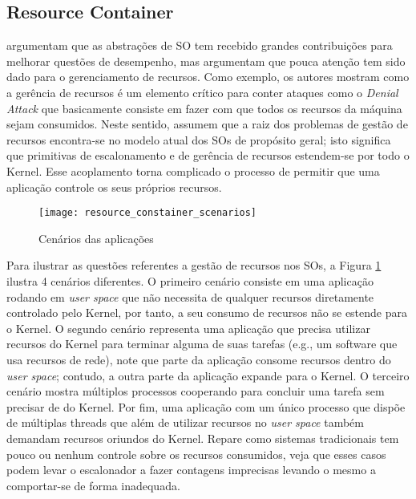 \subsection{Resource Container}
\label{sec:rc}

\cite{resourcecontainers} argumentam que as abstrações de SO tem recebido
grandes contribuições para melhorar questões de desempenho, mas argumentam que
pouca atenção tem sido dado para o gerenciamento de recursos. Como exemplo, os
autores mostram como a gerência de recursos é um elemento crítico para conter
ataques como o \emph{Denial Attack} que basicamente consiste em fazer
com que todos os recursos da máquina sejam consumidos. Neste sentido,
\cite{resourcecontainers} assumem que a raiz dos problemas de gestão de
recursos encontra-se no modelo atual dos SOs de propósito geral; isto significa
que primitivas de escalonamento e de gerência de recursos estendem-se por todo
o Kernel. Esse acoplamento torna complicado o processo de permitir que uma
aplicação controle os seus próprios recursos.

\begin{figure}[!h]
  \centering
  \texttt{[image: resource\_constainer\_scenarios]} 
  \caption{Cenários das aplicações}
  \label{fig:resource_constainer_scenarios}
\end{figure}

Para ilustrar as questões referentes a gestão de recursos nos SOs, a Figura
\ref{fig:resource_constainer_scenarios} ilustra 4 cenários diferentes. O
primeiro cenário consiste em uma aplicação rodando em \textit{user space} que
não necessita de qualquer recursos diretamente controlado pelo Kernel, por
tanto, a seu consumo de recursos não se estende para o Kernel. O segundo
cenário representa uma aplicação que precisa utilizar recursos do Kernel para
terminar alguma de suas tarefas (e.g., um software que usa recursos de rede),
note que parte da aplicação consome recursos dentro do \textit{user space};
contudo, a outra parte da aplicação expande para o Kernel. O terceiro cenário
mostra múltiplos processos cooperando para concluir uma tarefa sem precisar de
do Kernel. Por fim, uma aplicação com um único processo que dispõe de
múltiplas threads que além de utilizar recursos no \textit{user space} também
demandam recursos oriundos do Kernel. Repare como sistemas tradicionais tem
pouco ou nenhum controle sobre os recursos consumidos, veja que esses casos
podem levar o escalonador a fazer contagens imprecisas levando o mesmo a
comportar-se de forma inadequada.

